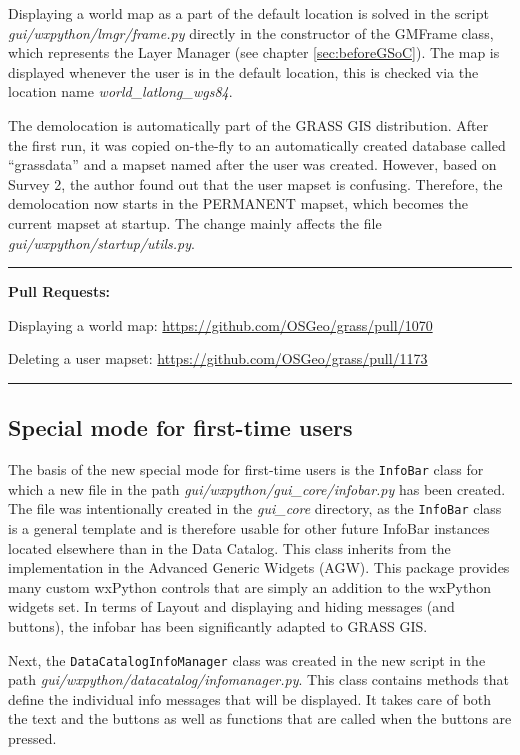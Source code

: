 \documentclass[a4paper,10pt,twoside]{article}
\begin{document}
\noindent \large Displaying a world map as a part of the default
location is solved in the script \textit{gui/wxpython/lmgr/frame.py}
directly in the constructor of the GMFrame class, which represents the
Layer Manager (see chapter \ref{sec:beforeGSoC}). The map is displayed
whenever the user is in the default location, this is checked via the
location name \textit{world\_latlong\_wgs84}.

The demolocation is automatically part of the GRASS GIS
distribution. After the first run, it was copied on-the-fly to an
automatically created database called ``grassdata'' and a mapset named
after the user was created. However, based on Survey 2, the author
found out that the user mapset is confusing. Therefore, the
demolocation now starts in the PERMANENT mapset, which becomes the
current mapset at startup. The change mainly affects the file
\textit{gui/wxpython/startup/utils.py}.

\par\noindent\rule{\textwidth}{0.4pt}
\textbf{Pull Requests:}

Displaying a world map: \url{https://github.com/OSGeo/grass/pull/1070}

Deleting a user mapset: \url{https://github.com/OSGeo/grass/pull/1173}

\par\noindent\rule{\textwidth}{0.4pt}

\subsection{Special mode for first-time users}

\noindent \large The basis of the new special mode for first-time
users is the \texttt{InfoBar} class for which a new file in the path
\textit{gui/wxpython/gui\_core/infobar.py} has been created. The file
was intentionally created in the \textit{gui\_core} directory, as the
\texttt{InfoBar} class is a general template and is therefore usable
for other future InfoBar instances located elsewhere than in the Data
Catalog. This class inherits from the implementation in the Advanced
Generic Widgets (AGW). This package provides many custom wxPython
controls that are simply an addition to the wxPython widgets set. In
terms of Layout and displaying and hiding messages (and buttons), the
infobar has been significantly adapted to GRASS GIS.

Next, the \texttt{DataCatalogInfoManager} class was created in the new
script in the path
\textit{gui/wxpython/datacatalog/infomanager.py}. This class contains
methods that define the individual info messages that will be
displayed. It takes care of both the text and the buttons as well as
functions that are called when the buttons are pressed.
\end{document}
